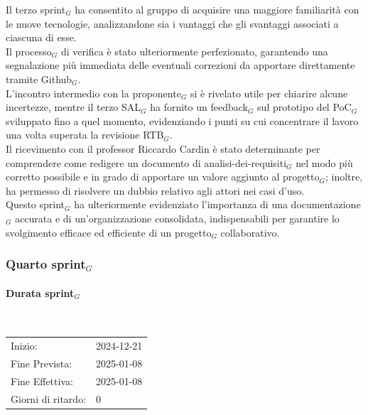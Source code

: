 \documentclass[10pt]{article}
\begin{document}
{{{{    Il terzo sprint$_G$ ha consentito al gruppo di acquisire una maggiore familiarità con le nuove tecnologie, analizzandone sia i vantaggi che gli svantaggi associati a ciascuna di esse.\\
    Il processo$_G$ di verifica è stato ulteriormente perfezionato, garantendo una segnalazione più immediata delle eventuali correzioni da apportare direttamente tramite Github$_G$.\\
    L'incontro intermedio con la proponente$_G$ si è rivelato utile per chiarire alcune incertezze, mentre il terzo SAL$_G$ ha fornito un feedback$_G$ sul prototipo del PoC$_G$ sviluppato fino a quel momento, evidenziando i punti su cui concentrare il lavoro una volta superata la revisione RTB$_G$.\\
    Il ricevimento con il professor Riccardo Cardin è stato determinante per comprendere come redigere un documento di analisi-dei-requisiti$_G$ nel modo più corretto possibile e in grado di apportare un valore aggiunto al progetto$_G$; inoltre, ha permesso di risolvere un dubbio relativo agli attori nei casi d'uso.\\
    Questo sprint$_G$ ha ulteriormente evidenziato l'importanza di una documentazione$_G$ accurata e di un'organizzazione consolidata, indispensabili per garantire lo svolgimento efficace ed efficiente di un progetto$_G$ collaborativo.


\newpage
\subsubsection{Quarto sprint$_G$}
\label{quarto-sprint$_G$}
    
    \paragraph{Durata sprint$_G$}\mbox{}\\
    \vspace{-1.5em}
    \begin{table}[h] 
    \renewcommand{\arraystretch}{1.2}  
    \begin{tabular}{ l l }
        Inizio: & 2024-12-21 \\
        Fine Prevista: & 2025-01-08 \\
        Fine Effettiva: & 2025-01-08 \\
        Giorni di ritardo: & 0 \\
    \end{tabular}
    \end{table}
    \vspace{-2em}
    {\renewcommand{\arraystretch}{1.5}%
    
}}}}}
\end{document}
